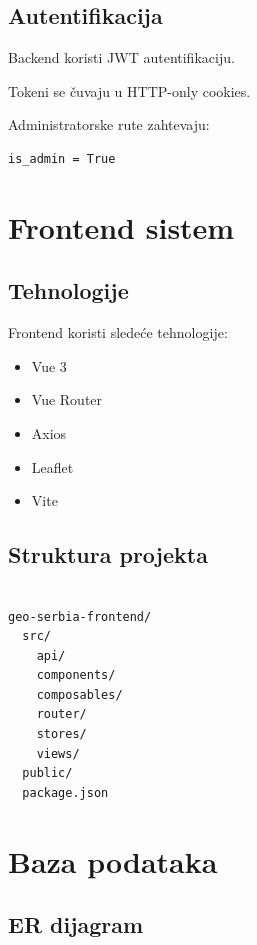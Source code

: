 \documentclass[a4paper,12pt,projekat]{etf}
\begin{document}
\section{Autentifikacija}

Backend koristi JWT autentifikaciju.

Tokeni se čuvaju u HTTP-only cookies.

Administratorske rute zahtevaju:

\begin{verbatim}
is_admin = True
\end{verbatim}

\chapter{Frontend sistem}

\section{Tehnologije}

Frontend koristi sledeće tehnologije:

\begin{itemize}

\item Vue 3
\item Vue Router
\item Axios
\item Leaflet
\item Vite

\end{itemize}

\section{Struktura projekta}

\begin{verbatim}

geo-serbia-frontend/
  src/
    api/
    components/
    composables/
    router/
    stores/
    views/
  public/
  package.json

\end{verbatim}

\chapter{Baza podataka}

\section{ER dijagram}
\end{document}
